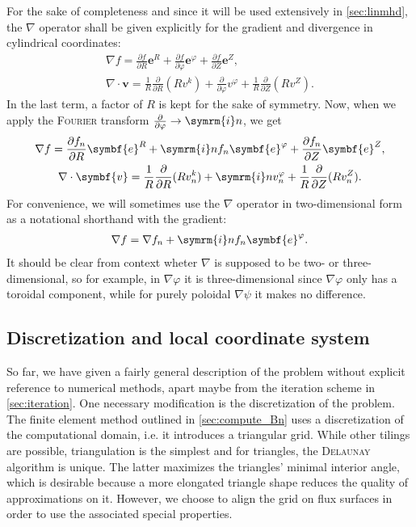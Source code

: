 \documentclass[a4paper, twoside, 10pt, english]{article}
\numberwithin{equation}{section}
\let\temp\varrho
\let\varrho\rho
\let\rho\temp
\let\temp\vartheta
\let\vartheta\theta
\let\theta\temp
\let\temp\varphi
\let\varphi\phi
\let\phi\temp
\let\vec\symbf
\newcommand*\grad{\ensuremath{\nabla}}
\newcommand*\divg{\ensuremath{\nabla \cdot}}
\newcommand*\im{\ensuremath{\symrm{i}}}  %
\newcommand*\pd[2][]{\ensuremath{\frac{\partial #1}{\partial #2}}}  %
\begin{document}
For the sake of completeness and since it will be used extensively in \cref{sec:linmhd}, the $\nabla$ operator shall be given explicitly for the gradient and divergence in cylindrical coordinates:
\begin{gather}
  \grad f = \pd[f]{R} \vec{e}^{R} + \pd[f]{\phi} \vec{e}^{\phi} + \pd[f]{Z} \vec{e}^{Z}, \\
  \divg \vec{v} = \frac{1}{R} \pd{R} (R v^{k}) + \pd{\phi} v^{\phi} + \frac{1}{R} \pd{Z} (R v^{Z}).
\end{gather}
In the last term, a factor of $R$ is kept for the sake of symmetry. Now, when we apply the \textsc{Fourier} transform $\pd{\phi} \to \im n$, we get
\begin{gather}
  \grad f = \pd[f_{n}]{R} \vec{e}^{R} + \im n f_{n} \vec{e}^{\phi} + \pd[f_{n}]{Z} \vec{e}^{Z}, \\
  \divg \vec{v} = \frac{1}{R} \pd{R} (R v_{n}^{k}) + \im n v_{n}^{\phi} + \frac{1}{R} \pd{Z} (R v_{n}^{Z}).
\end{gather}
For convenience, we will sometimes use the $\nabla$ operator in two-dimensional form as a notational shorthand with the gradient:
\begin{gather}
  \grad f = \grad f_{n} + \im n f_{n} \vec{e}^{\phi}.
\end{gather}
It should be clear from context wheter $\nabla$ is supposed to be two- or three-dimensional, so for example, in $\grad \phi$ it is three-dimensional since $\grad \phi$ only has a toroidal component, while for purely poloidal $\grad \psi$ it makes no difference.

\subsection{Discretization and local coordinate system}
\label{sec:grid}

So far, we have given a fairly general description of the problem without explicit reference to numerical methods, apart maybe from the iteration scheme in \cref{sec:iteration}. One necessary modification is the discretization of the problem. The finite element method outlined in \cref{sec:compute_Bn} uses a discretization of the computational domain, i.e. it introduces a triangular grid. While other tilings are possible, triangulation is the simplest and for triangles, the \textsc{Delaunay} algorithm is unique. The latter maximizes the triangles' minimal interior angle, which is desirable because a more elongated triangle shape reduces the quality of approximations on it. However, we choose to align the grid on flux surfaces in order to use the associated special properties.
\end{document}
